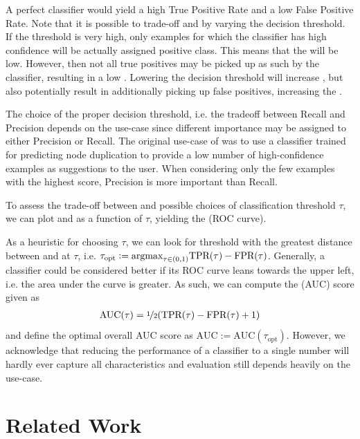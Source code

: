 \documentclass[
	fontsize=10pt, %
	twoside=false, %
	secnumdepth=1, %
]{kaobook}
\begin{document}
A perfect classifier would yield a high True Positive Rate and a low False
Positive Rate.
%
Note that it is possible to trade-off \FPR and \TPR
by varying the decision threshold. If the threshold is very high, only examples
for which the classifier has high confidence will be actually assigned positive
class. This means that the \FPR will be low. However, then not all true
positives may be picked up as such by the classifier, resulting in a low \TPR.
Lowering the decision threshold will increase \TPR, but also potentially result
in additionally picking up false positives, increasing the \FPR.

The choice of the proper decision threshold, i.e. the tradeoff between Recall
and Precision depends on the use-case since different importance may be assigned
to either Precision or Recall.
%
The original use-case of \nielsen was to use a classifier trained for predicting
node duplication to provide a low number of high-confidence examples as
suggestions to the user. When considering only the few examples with the highest
score, Precision is more important than Recall.

To assess the trade-off between \FPR and \TPR \wrt possible choices of
classification threshold $\tau$, we can plot \FPR and \TPR as a function of
$\tau$, yielding the  (ROC curve).

As a heuristic for choosing $\tau$, we can look for threshold with the greatest
distance between \TPR and \FPR at $\tau$, i.e. $\tau_{\text{opt}} := \argmax_{\tau \in
  (0,1)} \TPR(\tau) - \FPR(\tau)$.
Generally, a classifier could be considered better
if its ROC curve leans
towards the upper left, i.e. the area under the curve is greater. As such, we
can compute the  (AUC) score given as
\begin{align*}
  \text{AUC}(\tau) = \nicefrac{1}{2} (\TPR(\tau) - \FPR(\tau) + 1)
\end{align*}
and define the optimal overall AUC score as $\text{AUC} := \text{AUC}(\tau_{\text{opt}})$.
However, we acknowledge that reducing the performance of a classifier to a
single number will hardly ever capture all characteristics and evaluation still
depends heavily on the use-case.



\chapter{Related Work}
\label{sec:related-work}
\end{document}
